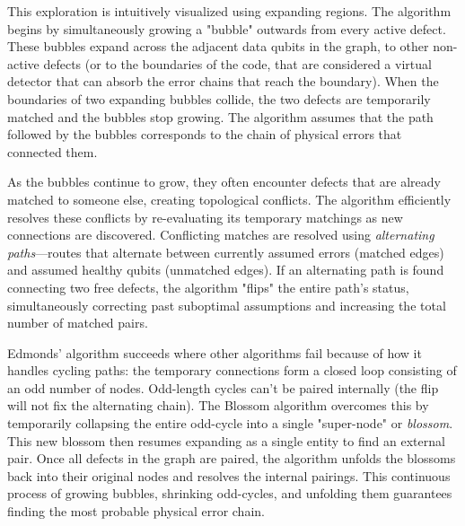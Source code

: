 This exploration is intuitively visualized using expanding regions. The algorithm begins by simultaneously growing a "bubble" outwards from every active defect. These bubbles expand across the adjacent data qubits in the graph, to other non-active defects (or to the boundaries of the code, that are considered a virtual detector that can absorb the error chains that reach the boundary). When the boundaries of two expanding bubbles collide, the two defects are temporarily matched and the bubbles stop growing. The algorithm assumes that the path followed by the bubbles corresponds to the chain of physical errors that connected them.

As the bubbles continue to grow, they often encounter defects that are already matched to someone else, creating topological conflicts. The algorithm efficiently resolves these conflicts by re-evaluating its temporary matchings as new connections are discovered. Conflicting matches are resolved using \textit{alternating paths}—routes that alternate between currently assumed errors (matched edges) and assumed healthy qubits (unmatched edges). If an alternating path is found connecting two free defects, the algorithm "flips" the entire path's status, simultaneously correcting past suboptimal assumptions and increasing the total number of matched pairs.

Edmonds' algorithm succeeds where other algorithms fail because of how it handles cycling paths: the temporary connections form a closed loop consisting of an odd number of nodes. Odd-length cycles can't be paired internally (the flip will not fix the alternating chain). The Blossom algorithm overcomes this by temporarily collapsing the entire odd-cycle into a single "super-node" or \textit{blossom}. This new blossom then resumes expanding as a single entity to find an external pair. Once all defects in the graph are paired, the algorithm unfolds the blossoms back into their original nodes and resolves the internal pairings. This continuous process of growing bubbles, shrinking odd-cycles, and unfolding them guarantees finding the most probable physical error chain.

